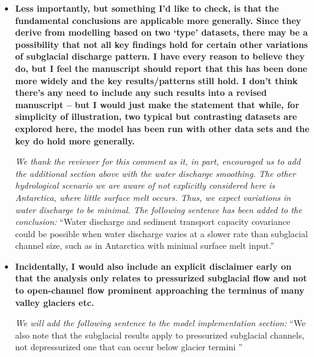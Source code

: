 \documentclass[11pt]{article}
\newcommand{\alpine}{\textit{ALPINE}\,}
\newcommand{\icesheet}{\textit{ICESHEET}\,}
\begin{document}
\begin{itemize}
  
Water discharge and sediment transport characteristics correlate better in \icesheet{} with lower diurnal variations in water discharge compared to the \alpine{}.
To evaluate the impact of water discharge variability, we smoothed the two hydrographs across different periods and evaluated the Spearman rank correlation between sediment transport characteristics and water discharge.
We assume that a higher rank correlation indicates a reduced amount of hysteresis and behavior more similar subaerial channels (Figure~3).

Smoothing water discharge over periods longer than one day causes a substantial increase in rank correlation (Figure~5).
This increase occurs as diurnal variations are removed (Figures S1-S14).
Correlations in sediment transport characteristics in \icesheet{} remain higher than \alpine, which has more water discharge variations even when smoothed compared to \icesheet{} (Figure~S1-S14).  

  
\item \textbf{Less importantly, but something I’d like to check, is that the fundamental conclusions are
    applicable more generally. Since they derive from modelling based on two ‘type’ datasets, there
    may be a possibility that not all key findings hold for certain other variations of subglacial
    discharge pattern. I have every reason to believe they do, but I feel the manuscript should report
    that this has been done more widely and the key results/patterns still hold. I don’t think there’s
    any need to include any such results into a revised manuscript – but I would just make the
    statement that while, for simplicity of illustration, two typical but contrasting datasets are
    explored here, the model has been run with other data sets and the key do hold more generally.}

  \textit{We thank the reviewer for this comment as it, in part, encouraged us to add the additional section above with the water discharge smoothing.
    The other hydrological scenario we are aware of not explicitly considered here is Antarctica, where little surface melt occurs.
    Thus, we expect variations in water discharge to be minimal.
    The following sentence has been added to the conclusion:}
    ``Water discharge and sediment transport capacity covariance could be possible when water discharge varies at a slower rate than subglacial channel size, such as in Antarctica with minimal surface melt input.''
    
\item   \textbf{
    Incidentally, I would also include an explicit disclaimer early on that the analysis only relates to
    pressurized subglacial flow and not to open-channel flow prominent approaching the terminus of
    many valley glaciers etc.}

   \textit{ We will add the following sentence to the model implementation section:}
``We also note that the subglacial results apply to pressurized subglacial channels, not depressurized one that can occur below glacier termini \citep{perolo2018}''
\end{itemize}
\end{document}
